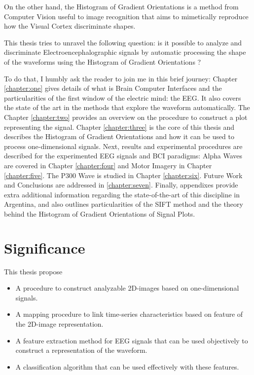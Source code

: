 
On the other hand, the Histogram of Gradient Orientations is a method from Computer Vision useful to image recognition that aims to mimetically reproduce how the Visual Cortex discriminate shapes.

This thesis tries to unravel the following question:  is it possible to analyze and discriminate Electroencephalographic signals by automatic processing the shape of the waveforms using the Histogram of Gradient Orientations ?

To do that, I humbly ask the reader to join me in this brief journey:  Chapter  \ref{chapter:one} gives details of what is Brain Computer Interfaces and the particularities of the first window of the electric mind: the EEG. It also covers the state of the art in the methods that explore the waveform automatically.  The Chapter \ref{chapter:two} provides an overview on the procedure to construct a plot representing the signal. Chapter \ref{chapter:three} is the core of this thesis and describes the Histogram of Gradient Orientations and how it can be used to process one-dimensional signals.
Next, results and experimental procedures are described for the experimented EEG signals and  BCI paradigms:  Alpha Waves are covered in Chapter \ref{chapter:four} and Motor Imagery in Chapter \ref{chapter:five}. The P300 Wave is studied in Chapter \ref{chapter:six}.  Future Work and Conclusions are addressed in \ref{chapter:seven}.  Finally, appendixes provide extra additional information regarding the state-of-the-art of this discipline in Argentina, and also outlines particularities of the SIFT method and the theory behind the Histogram of Gradient Orientations of Signal Plots.

\section{Significance}

This thesis propose

\begin{itemize}
\item A procedure to construct analyzable 2D-images based on one-dimensional signals.
\item A mapping procedure to link time-series characteristics based on feature of the 2D-image representation.
\item A feature extraction method for EEG signals that can be used objectively to construct a representation of the waveform.
\item A classification algorithm that can be used effectively with these features.
\end{itemize}

